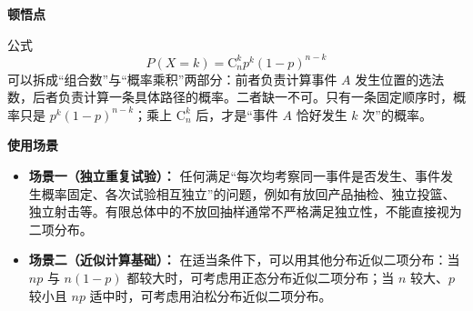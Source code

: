 \begin{explanationbox}
	\medskip
	\textbf{\textcolor{CExplanation}{顿悟点}}

	公式
	\[
		P(X=k)=\mathrm{C}_n^k p^k(1-p)^{n-k}
	\]
	可以拆成“组合数”与“概率乘积”两部分：前者负责计算事件 $A$ 发生位置的选法数，后者负责计算一条具体路径的概率。二者缺一不可。只有一条固定顺序时，概率只是 $p^k(1-p)^{n-k}$；乘上 $\mathrm{C}_n^k$ 后，才是“事件 $A$ 恰好发生 $k$ 次”的概率。

	\medskip
	\textbf{\textcolor{CExplanation}{使用场景}}
	\begin{itemize}[leftmargin=*, itemsep=0.5em, topsep=0.4em]
		\item \textbf{场景一（独立重复试验）：} 任何满足“每次均考察同一事件是否发生、事件发生概率固定、各次试验相互独立”的问题，例如有放回产品抽检、独立投篮、独立射击等。有限总体中的不放回抽样通常不严格满足独立性，不能直接视为二项分布。
		\item \textbf{场景二（近似计算基础）：} 在适当条件下，可以用其他分布近似二项分布：当 $np$ 与 $n(1-p)$ 都较大时，可考虑用正态分布近似二项分布；当 $n$ 较大、$p$ 较小且 $np$ 适中时，可考虑用泊松分布近似二项分布。
	\end{itemize}
\end{explanationbox}
